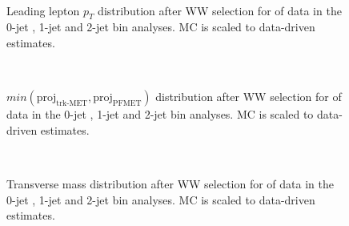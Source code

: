 \begin{figure}[!hbtp]
\centering
\subfigure[]{
\centering
\label{subfig:ww_ptmax_0j}
}
\subfigure[]{
\centering
\label{subfig:ww_ptmax_1j}
}
\subfigure[]{
\centering
\label{subfig:ww_ptmax_2j}
}\\
\caption{Leading lepton $p_T$ distribution after WW selection for \intlumiEightTeV of data in the 0-jet , 
1-jet  and 2-jet  bin analyses. 
MC is scaled to data-driven estimates.}
\label{fig:ww_ptmax}
\end{figure}

\begin{figure}[!hbtp]
\centering
\subfigure[]{
\centering
\label{subfig:ww_pmet_0j}
}
\subfigure[]{
\centering
\label{subfig:ww_pmet_1j}
}
\subfigure[]{
\centering
\label{subfig:ww_pmet_2j}
}\\
\caption{$min(\text{proj}_\text{trk-MET}, \text{proj}_\text{PFMET})$ distribution after WW selection for \intlumiEightTeV of data in the 0-jet , 
1-jet  and 2-jet  bin analyses. 
MC is scaled to data-driven estimates.}
\label{fig:ww_pmet}
\end{figure}

\begin{figure}[!hbtp]
\centering
\subfigure[]{
\centering
\label{subfig:ww_mt_0j}
}
\subfigure[]{
\centering
\label{subfig:ww_mt_1j}
}
\subfigure[]{
\centering
\label{subfig:ww_mt_2j}
} \\
\caption{Transverse mass distribution after WW selection for \intlumiEightTeV of data in the 0-jet , 
1-jet  and 2-jet  bin analyses. 
MC is scaled to data-driven estimates.}
\label{fig:ww_mt}
\end{figure}

